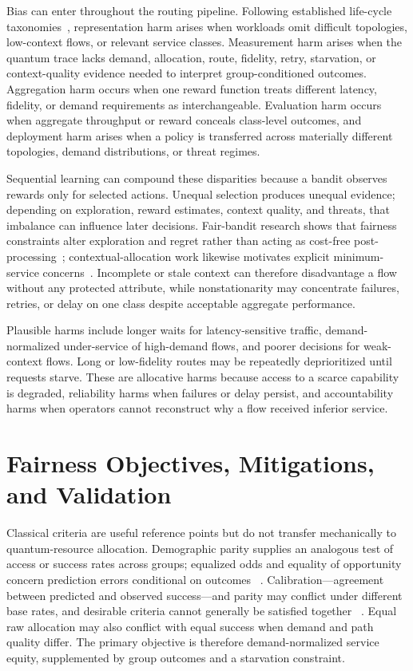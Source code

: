\documentclass[10pt,conference]{IEEEtran}
\begin{document}
Bias can enter throughout the routing pipeline. Following established
life-cycle taxonomies~\cite{suresh2021framework,mehrabi2021survey},
representation harm arises when workloads omit difficult topologies,
low-context flows, or relevant service classes. Measurement harm arises when
the quantum trace lacks demand, allocation, route, fidelity, retry, starvation,
or context-quality evidence needed to interpret group-conditioned outcomes.
Aggregation harm occurs when one reward function treats different latency,
fidelity, or demand requirements as interchangeable. Evaluation harm occurs
when aggregate throughput or reward conceals class-level outcomes, and
deployment harm arises when a policy is transferred across materially different
topologies, demand distributions, or threat regimes.

Sequential learning can compound these disparities because a bandit observes
rewards only for selected actions. Unequal selection produces unequal evidence;
depending on exploration, reward estimates, context quality, and threats, that
imbalance can influence later decisions. Fair-bandit research shows that
fairness constraints alter exploration and regret rather than acting as
cost-free post-processing~\cite{joseph2016fairness}; contextual-allocation work
likewise motivates explicit minimum-service concerns~\cite{chen2020fair}.
Incomplete or stale context can therefore disadvantage a flow without any
protected attribute, while nonstationarity may concentrate failures, retries,
or delay on one class despite acceptable aggregate performance.

Plausible harms include longer waits for latency-sensitive traffic,
demand-normalized under-service of high-demand flows, and poorer decisions for
weak-context flows. Long or low-fidelity routes may be repeatedly
deprioritized until requests starve. These are allocative harms because access
to a scarce capability is degraded, reliability harms when failures or delay
persist, and accountability harms when operators cannot reconstruct why a flow
received inferior service.

\section{Fairness Objectives, Mitigations, and Validation}

Classical criteria are useful reference points but do not transfer mechanically
to quantum-resource allocation. Demographic parity supplies an analogous test
of access or success rates across groups; equalized odds and equality of
opportunity concern prediction errors conditional on outcomes
~\cite{hardt2016equality}. Calibration---agreement between predicted and
observed success---and parity may conflict under different base rates, and
desirable criteria cannot generally be satisfied together
~\cite{chouldechova2017fair,kleinberg2017tradeoffs}. Equal raw allocation may
also conflict with equal success when demand and path quality differ. The
primary objective is therefore demand-normalized service equity, supplemented
by group outcomes and a starvation constraint.
\end{document}
